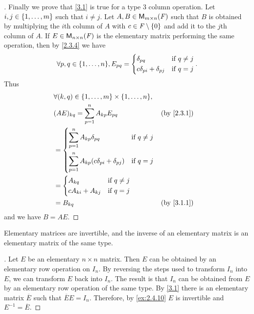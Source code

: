 \begin{proof}[]
  Finally we prove that \cref{3.1} is true for a type 3 column operation.
  Let \(i, j \in \left\lbrace1, \dots, m\right\rbrace\) such that \(i \neq j\).
  Let \(A, B \in \mathsf{M}_{{m} \times n}({\mathit{F}})\) such that \(B\) is obtained by multiplying the \(i\)th column of \(A\) with \(c \in \mathit{F} \setminus \left\lbrace0\right\rbrace\) and add it to the \(j\)th column of \(A\).
  If \(E \in \mathsf{M}_{{n} \times n}({\mathit{F}})\) is the elementary matrix performing the same operation, then by \cref{2.3.4} we have
  \[
    \forall p, q \in \set{1, \dots, n}, E_{p q} = \begin{dcases}
      \delta_{p q}                  & \text{if } q \neq j \\
      c \delta_{p i} + \delta_{p j} & \text{if } q = j
    \end{dcases}.
  \]
  Thus
  \begin{align*}
     & \forall (k, q) \in \set{1, \dots, m} \times \set{1, \dots, n},                                                \\
     & (AE)_{k q} = \sum_{p = 1}^n A_{k p} E_{p q}                                     &  & \text{(by \cref{2.3.1})} \\
     & = \begin{dcases}
           \sum_{p = 1}^n A_{k p} \delta_{p q}                    & \text{if } q \neq j \\
           \sum_{p = 1}^n A_{k p} (c \delta_{p i} + \delta_{p j}) & \text{if } q = j
         \end{dcases}                                \\
     & = \begin{dcases}
           A_{k q}             & \text{if } q \neq j \\
           c A_{k i} + A_{k j} & \text{if } q = j
         \end{dcases}                                                                   \\
     & = B_{k q}                                                                       &  & \text{(by \cref{3.1.1})}
  \end{align*}
  and we have \(B = AE\).
\end{proof}

\begin{thm}\label{3.2}
  Elementary matrices are invertible, and the inverse of an elementary matrix is an elementary matrix of the same type.
\end{thm}

\begin{proof}[]
  Let \(E\) be an elementary \(n \times n\) matrix.
  Then \(E\) can be obtained by an elementary row operation on \(I_n\).
  By reversing the steps used to transform \(I_n\) into \(E\), we can transform \(E\) back into \(I_n\).
  The result is that \(I_n\) can be obtained from \(E\) by an elementary row operation of the same type.
  By \cref{3.1} there is an elementary matrix \(\overline{E}\) such that \(\overline{E} E = I_n\).
  Therefore, by \cref{ex:2.4.10} \(E\) is invertible and \(E^{-1} = \overline{E}\).
\end{proof}

